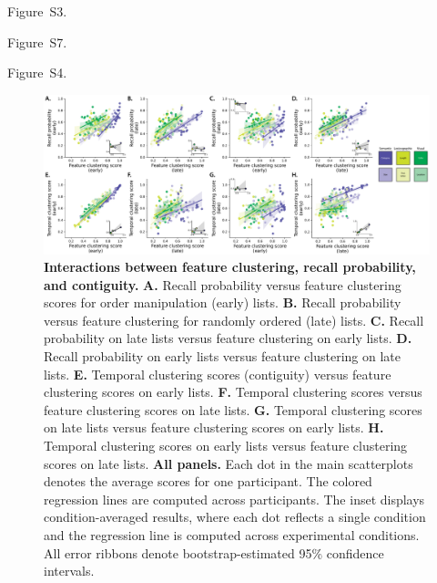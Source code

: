 \documentclass[11pt]{article}
\newcommand{\accuracyByList}{S3}
\newcommand{\clusterCorrs}{S4}
\newcommand{\recallInit}{S7}
\begin{document}






Figure~\accuracyByList.

Figure~\recallInit.



Figure~\clusterCorrs.





\begin{figure}[tp] \centering
\includegraphics[width=\textwidth]{figures/feature_clustering_vs_accuracy_and_contiguity}

\caption{\textbf{Interactions between feature clustering, recall probability,
and contiguity.} \textbf{A.} Recall probability versus feature clustering
scores for order manipulation (early) lists. \textbf{B.} Recall probability
versus feature clustering for randomly ordered (late) lists. \textbf{C.} Recall
probability on late lists versus feature clustering on early lists. \textbf{D.}
Recall probability on early lists versus feature clustering on late lists.
\textbf{E.} Temporal clustering scores (contiguity) versus feature clustering
scores on early lists. \textbf{F.} Temporal clustering scores versus feature
clustering scores on late lists. \textbf{G.} Temporal clustering scores on late
lists versus feature clustering scores on early lists. \textbf{H.} Temporal
clustering scores on early lists versus feature clustering scores on late
lists. \textbf{All panels.} Each dot in the main scatterplots denotes the
average scores for one participant. The colored regression lines are computed
across participants. The inset displays condition-averaged results, where each
dot reflects a single condition and the regression line is computed across
experimental conditions. All error ribbons denote bootstrap-estimated 95\%
confidence intervals.} \label{fig:clustering-scatterplots} 

\end{figure}
\end{document}
